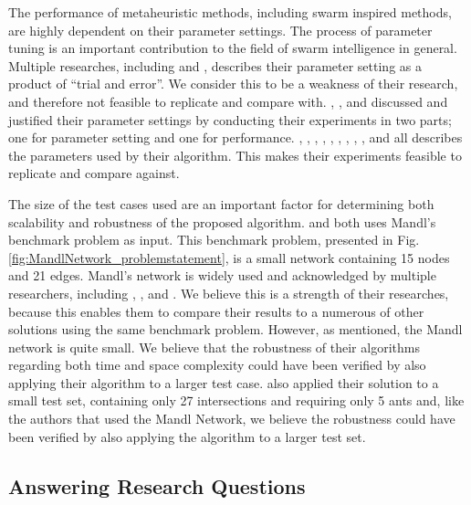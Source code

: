 The performance of metaheuristic methods, including swarm inspired methods, are highly dependent on their parameter settings. The process of parameter tuning is an important contribution to the field of swarm intelligence in general. Multiple researches, including \citet{salehi-nezhad07} and \citet{yang07}, describes their parameter setting as a product of ``trial and error''. We consider this to be a weakness of their research, and therefore not feasible to replicate and compare with. \citet{sedighpour14}, \citet{poorzahedy11}, and \citet{kechagiopoulos14} discussed and justified their parameter settings by conducting their experiments in two parts; one for parameter setting and one for performance. \citet{hsiao04}, \citet{salehi-nezhad07}, \citet{tripathi09}, \citet{sedighpour14}, \citet{yang07}, \citet{salehinejad10}, \citet{jiang10}, \citet{poorzahedy11}, \citet{nikolic14}, and \citet{kechagiopoulos14} all describes the parameters used by their algorithm. This makes their experiments feasible to replicate and compare against.  

The size of the test cases used are an important factor for determining both scalability and robustness of the proposed algorithm. \citet{nikolic14} and \citet{kechagiopoulos14} both uses Mandl's benchmark problem as input. This benchmark problem, presented in Fig. \vref{fig:MandlNetwork_problemstatement},  is a small network containing 15 nodes and 21 edges.  Mandl's network is widely used and acknowledged by multiple researchers, including \citet{baaj91}, \citet{chakroborty02}, and \citet{fan09}. We believe this is a strength of their researches, because this enables them to compare their results to a numerous of other solutions using the same benchmark problem. However, as mentioned, the Mandl network is quite small. We believe that the robustness of their algorithms regarding both time and space complexity could have been verified by also applying their algorithm to a larger test case. \citet{salehi-nezhad07} also applied their solution to a small test set, containing only 27 intersections and requiring only 5 ants and, like the authors that used the Mandl Network, we believe the robustness could have been verified by also applying the algorithm to a larger test set.  \newline

\subsection{Answering Research Questions}

